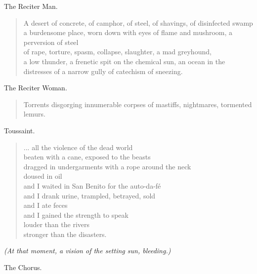 \documentclass[letterpaper,article,12pt,oneside,notitlepage]{memoir}
\begin{document}
\begin{center}The Reciter Man.\end{center}

\begin{verse}
A desert of concrete, of camphor, of steel, of shavings, of disinfected swamp \\
a burdensome place, worn down with eyes of flame and mushroom, a perversion of steel \\
of rape, torture, spasm, collapse, slaughter, a mad greyhound, \\
a low thunder, a frenetic spit on the chemical sun, an ocean in the distresses of a narrow gully of catechism of sneezing. \\
\end{verse}

\begin{center}The Reciter Woman.\end{center}

\begin{verse}
Torrents disgorging innumerable corpses of mastiffs, nightmares, tormented lemurs. \\
\end{verse}

\begin{center}Toussaint.\end{center}

\begin{verse}
... all the violence of the dead world \\
beaten with a cane, exposed to the beasts \\
dragged in undergarments with a rope around the neck \\
doused in oil \\
and I waited in San Benito for the auto-da-fé \\
and I drank urine, trampled, betrayed, sold \\
and I ate feces \\
and I gained the strength to speak \\
louder than the rivers \\
stronger than the disasters. \\
\end{verse}

\textit{(At that moment, a vision of the setting sun, bleeding.)}

\begin{center}The Chorus.\end{center}
\end{document}
